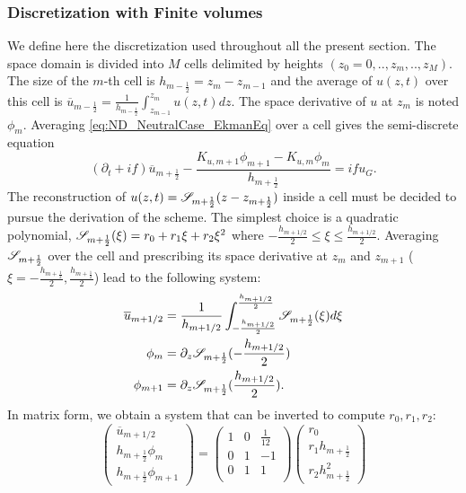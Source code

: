 \subsubsection{Discretization with Finite volumes}
We define here the discretization used throughout all the present
section. The space domain is divided into $M$ cells delimited by
heights $(z_0=0, .., z_m, .., z_M)$. The size of the $m$-th cell
is $h_{m-\frac{1}{2}}=z_{m}-z_{m-1}$ and the average of $u(z, t)$
over this cell is 
$\overline{u}_{m-\frac{1}{2}}=\frac{1} {h_{m-\frac{1}{2}}}
\int_{z_{m-1}}^{z_m}u(z, t)dz$.
The space derivative of $u$ at $z_m$ is noted $\phi_{m}$.
Averaging \eqref{eq:ND_NeutralCase_EkmanEq} over a cell gives
the semi-discrete equation
\begin{equation}
\label{eq:ND_NeutralCase_semiDiscreteEkmanEq}
	(\partial_t + if) \overline{u}_{m+\frac{1}{2}} - 
	\frac{K_{u, m+1} \phi_{m+1} - K_{u, m} \phi_{m}}
		{h_{m+\frac{1}{2}}} = i f u_G.
\end{equation}
The reconstruction of $u(z, t) = {\cal S}_{m+\frac{1}{2}}
				(z - z_{m+\frac{1}{2}})$
				inside a cell must be decided
to pursue the derivation of the scheme. The simplest choice is
a quadratic polynomial,
${\cal S}_{m+\frac{1}{2}}(\xi) = r_0 + r_1 \xi + r_2 \xi^2$ where
$-\frac{h_{m+1/2}}{2} \leq \xi \leq \frac{h_{m+1/2}}{2}$.
Averaging ${\cal S}_{m+\frac{1}{2}}$ over the cell and
prescribing its space derivative at $z_{m}$ and $z_{m+1}$
($\xi=-\frac{h_{m+\frac{1}{2}}}{2}, \frac{h_{m+\frac{1}{2}}}{2}$)
lead to the following system:
\begin{equation}
	\begin{aligned}
		\overline{u}_{m+1/2} &= \frac{1}{h_{m+1/2}}
		\int_{-\frac{h_{m+1/2}}{2}}^{\frac{h_{m+1/2}}{2}}
		{\cal S}_{m+\frac{1}{2}}(\xi)d\xi\\
		\phi_m &= \partial_z {\cal S}_{m+\frac{1}{2}}
		(-\frac{h_{m+1/2}}{2})\\
		\phi_{m+1} &=
		\partial_z {\cal S}_{m+\frac{1}{2}}
		(\frac{h_{m+1/2}}{2}).
	\end{aligned}
\end{equation}
In matrix form, we obtain a system that can be inverted to
compute $r_0, r_1, r_2$:
\begin{equation}
    \begin{pmatrix}
    \overline{u}_{m+1/2} \\
    h_{m+\frac{1}{2}} \phi_m \\
	    h_{m+\frac{1}{2}} \phi_{m+1}
    \end{pmatrix} = 
    \begin{pmatrix}
    1 & 0 & \frac{1}{12} \\
    0 & 1 & -1 \\
    0 & 1 & 1 \\
    \end{pmatrix}
    \begin{pmatrix}
    r_0 \\
    r_1 h_{m+\frac{1}{2}} \\
    r_2 h_{m+\frac{1}{2}}^2
    \end{pmatrix}
\end{equation}
